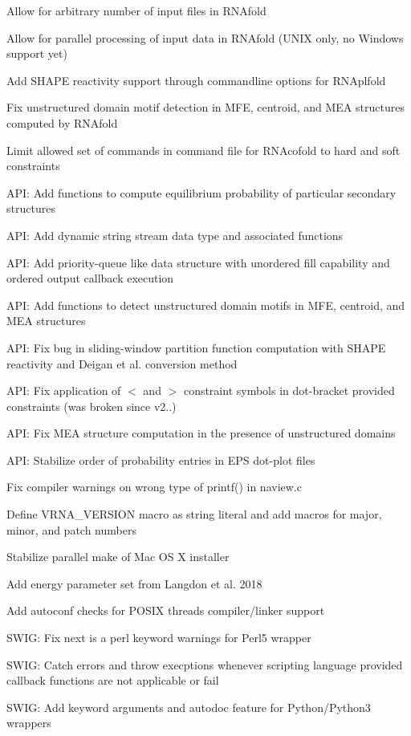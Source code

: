 \begin{DoxyItemize}
\item Allow for arbitrary number of input files in R\+N\+Afold
\item Allow for parallel processing of input data in R\+N\+Afold (U\+N\+IX only, no Windows support yet)
\item Add S\+H\+A\+PE reactivity support through commandline options for R\+N\+Aplfold
\item Fix unstructured domain motif detection in M\+FE, centroid, and M\+EA structures computed by R\+N\+Afold
\item Limit allowed set of commands in command file for R\+N\+Acofold to hard and soft constraints
\item A\+PI\+: Add functions to compute equilibrium probability of particular secondary structures
\item A\+PI\+: Add dynamic string stream data type and associated functions
\item A\+PI\+: Add priority-\/queue like data structure with unordered fill capability and ordered output callback execution
\item A\+PI\+: Add functions to detect unstructured domain motifs in M\+FE, centroid, and M\+EA structures
\item A\+PI\+: Fix bug in sliding-\/window partition function computation with S\+H\+A\+PE reactivity and Deigan et al. conversion method
\item A\+PI\+: Fix application of \textquotesingle{}$<$\textquotesingle{} and \textquotesingle{}$>$\textquotesingle{} constraint symbols in dot-\/bracket provided constraints (was broken since v2..)
\item A\+PI\+: Fix M\+EA structure computation in the presence of unstructured domains
\item A\+PI\+: Stabilize order of probability entries in E\+PS dot-\/plot files
\item Fix compiler warnings on wrong type of printf() in naview.\+c
\item Define V\+R\+N\+A\+\_\+\+V\+E\+R\+S\+I\+ON macro as string literal and add macros for major, minor, and patch numbers
\item Stabilize parallel make of Mac OS X installer
\item Add energy parameter set from Langdon et al. 2018
\item Add autoconf checks for P\+O\+S\+IX threads compiler/linker support
\item S\+W\+IG\+: Fix \textquotesingle{}next\textquotesingle{} is a perl keyword warnings for Perl5 wrapper
\item S\+W\+IG\+: Catch errors and throw execptions whenever scripting language provided callback functions are not applicable or fail
\item S\+W\+IG\+: Add keyword arguments and autodoc feature for Python/\+Python3 wrappers
\end{DoxyItemize}

